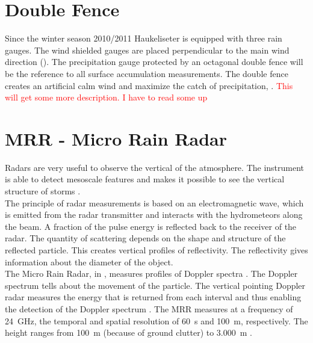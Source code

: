 \section{Double Fence}

Since the winter season 2010/2011 Haukeliseter is equipped with three rain gauges. The wind shielded gauges are placed perpendicular to the main wind direction (). The precipitation gauge protected by an octagonal double fence will be the reference to all surface accumulation measurements. The double fence creates an artificial calm wind and maximize the catch of precipitation, \citep{wolff_new_2010, wolff_measurements_2013, wolff_derivation_2015}. \textcolor{red}{This will get some more description. I have to read some up}
%

\section{MRR - Micro Rain Radar}

Radars are very useful to observe the vertical of the atmosphere. The instrument is able to detect mesoscale features and makes it possible to see the vertical structure of storms \citep{markowski_mesoscale_2011}.\\
The principle of radar measurements is based on an electromagnetic wave, which is emitted from the radar transmitter and interacts with the hydrometeors along the beam. A fraction of the pulse energy is reflected back to the receiver of the radar. The quantity of scattering depends on the shape and structure of the reflected particle. This creates vertical profiles of reflectivity. The reflectivity gives information about the diameter of the object. 
\\
The Micro Rain Radar, in , measures profiles of Doppler spectra \citep{metek_micro_2010}. The Doppler spectrum tells about the movement of the particle. The vertical pointing Doppler radar measures the energy that is returned from each interval and thus enabling the detection of the Doppler spectrum \citep{lecuyer_aos_2017}. The MRR measures at a frequency of \SI{24}{\giga\Hz}, the temporal and spatial resolution of \SI{60}{\second} and \SI{100}{\metre}, respectively. The height ranges from \SI{100}{\metre} (because of ground clutter) to \SI{3.000}{\metre} \citep{metek_micro_2010}.


